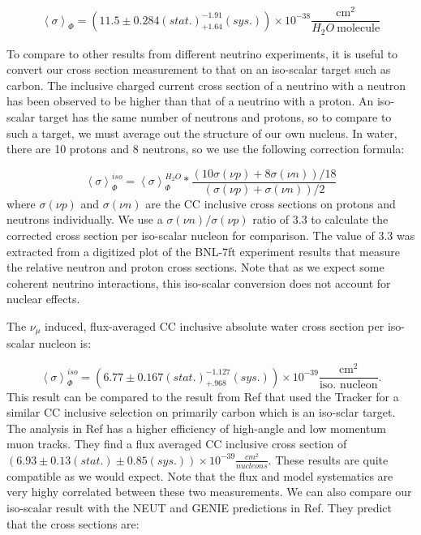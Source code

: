 \begin{equation}
\left<\sigma\right>_\Phi = (11.5 \pm 0.284 (stat.) ^{-1.91}_{+1.64} (sys.))\times 10^{-38} \frac{\text{cm}^2}{H_2O\:\text{molecule}}
\end{equation}

To compare to other results from different neutrino experiments, it is useful to convert our cross section measurement to that on an iso-scalar target such as carbon. The inclusive charged current cross section of a neutrino with a neutron has been observed to be higher than that of a neutrino with a proton. An iso-scalar target has the same number of neutrons and protons, so to compare to such a target, we must average out the structure of our own nucleus. In water, there are 10 protons and 8 neutrons, so we use the following correction formula:

\begin{equation}
\left<\sigma\right>_\Phi^{iso} = \left<\sigma\right>_\Phi^{H_2O}*\frac{(10\sigma(\nu p)+8\sigma(\nu n))/18}{(\sigma(\nu p)+\sigma(\nu n))/2}
\end{equation}
where $\sigma(\nu p)$ and $\sigma(\nu n)$ are the CC inclusive cross sections on protons and neutrons individually. We use a  $\sigma(\nu n)/\sigma(\nu p)$ ratio of 3.3 to calculate the corrected cross section per iso-scalar nucleon for comparison. The value of 3.3 was extracted from a digitized plot of the BNL-7ft experiment results that measure the relative neutron and proton cross sections. Note that as we expect some coherent neutrino interactions, this iso-scalar conversion does not account for nuclear effects.

The $\nu_\mu$ induced, flux-averaged CC inclusive absolute water cross section per iso-scalar nucleon is:

\begin{equation}
\left<\sigma\right>_\Phi^{iso} = (6.77 \pm 0.167 (stat.) ^{-1.127}_{+.968} (sys.))\times 10^{-39} \frac{\text{cm}^2}{\text{iso. nucleon}}.
\end{equation}
This result can be compared to the result from Ref\cite{ccinc} that used the Tracker for a similar CC inclusive selection on primarily carbon which is an iso-sclar target. The analysis in Ref\cite{ccinc} has a higher efficiency of high-angle and low momentum muon tracks. They find a flux averaged CC inclusive cross section of $(6.93 \pm 0.13 (stat.) \pm 0.85(sys.)) \times 10^{-39} \frac{cm^2}{nucleons}$. These results are quite compatible as we would expect. Note that the flux and model systematics are very highy correlated between these two measurements. We can also compare our iso-scalar result with the NEUT and GENIE predictions in Ref\cite{ccinc}. They predict that the cross sections are:

